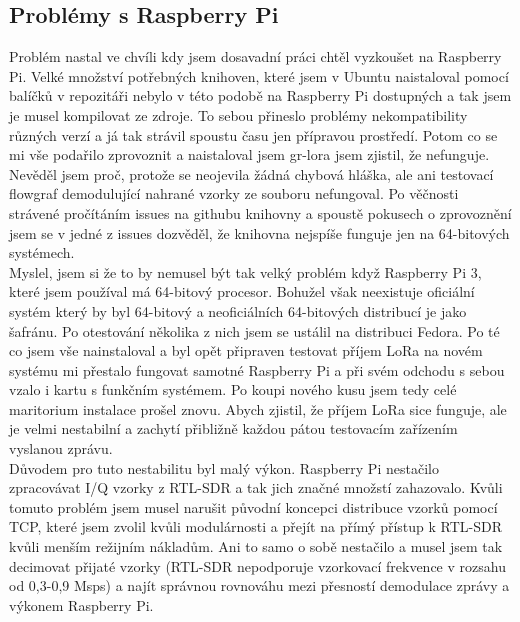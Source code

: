 \documentclass{ctuthesis}
\begin{document}
\subsection{Problémy s Raspberry Pi} \label{rpiproblems}
Problém nastal ve chvíli kdy jsem dosavadní práci chtěl vyzkoušet na Raspberry Pi. Velké množství potřebných knihoven, které jsem v Ubuntu naistaloval pomocí balíčků v repozitáři nebylo v této podobě na Raspberry Pi dostupných a tak jsem je musel kompilovat ze zdroje. To sebou přineslo problémy nekompatibility různých verzí a já tak strávil spoustu času jen přípravou prostředí. Potom co se mi vše podařilo zprovoznit a naistaloval jsem gr-lora jsem zjistil, že nefunguje. Nevěděl jsem proč, protože se neojevila žádná chybová hláška, ale ani testovací flowgraf demodulující nahrané vzorky ze souboru nefungoval. Po věčnosti strávené pročítáním issues na githubu knihovny a spoustě pokusech o zprovoznění jsem se v jedné z issues dozvěděl, že knihovna nejspíše funguje jen na 64-bitových systémech.\\
Myslel, jsem si že to by nemusel být tak velký problém když Raspberry Pi 3, které jsem používal má 64-bitový procesor. Bohužel však neexistuje oficiální systém který by byl 64-bitový a neoficiálních 64-bitových distribucí je jako šafránu. Po otestování několika z nich jsem se ustálil na distribuci Fedora. Po té co jsem vše nainstaloval a byl opět připraven testovat příjem LoRa na novém systému mi přestalo fungovat samotné Raspberry Pi a při svém odchodu s sebou vzalo i kartu s funkčním systémem. Po koupi nového kusu jsem tedy celé maritorium instalace prošel znovu. Abych zjistil, že příjem LoRa sice funguje, ale je velmi nestabilní a zachytí přibližně každou pátou testovacím zařízením vyslanou zprávu.\\
Důvodem pro tuto nestabilitu byl malý výkon. Raspberry Pi nestačilo zpracovávat I/Q vzorky z RTL-SDR a tak jich značné množstí zahazovalo. Kvůli tomuto problém jsem musel narušit původní koncepci distribuce vzorků pomocí TCP, které jsem zvolil kvůli modulárnosti a přejít na přímý přístup k RTL-SDR kvůli menším režijním nákladům. Ani to samo o sobě nestačilo a musel jsem tak decimovat přijaté vzorky (RTL-SDR nepodporuje vzorkovací frekvence v rozsahu od 0,3-0,9 Msps) a najít správnou rovnováhu mezi přesností demodulace zprávy a výkonem Raspberry Pi.
\end{document}
